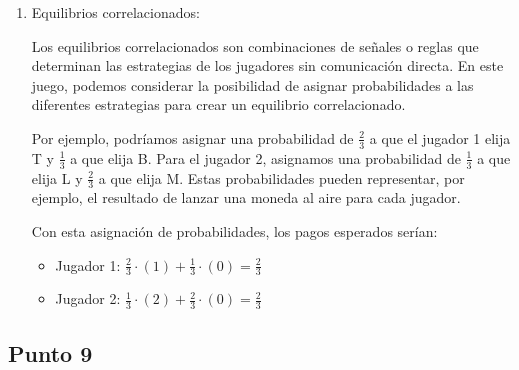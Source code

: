 \documentclass[11pt]{article}
\begin{document}
\begin{enumerate}
    \item Equilibrios correlacionados:
    
    Los equilibrios correlacionados son combinaciones de señales o reglas que determinan las estrategias de los jugadores sin comunicación directa. En este juego, podemos considerar la posibilidad de asignar probabilidades a las diferentes estrategias para crear un equilibrio correlacionado.
    
    Por ejemplo, podríamos asignar una probabilidad de $\frac{2}{3}$ a que el jugador 1 elija T y $\frac{1}{3}$ a que elija B. Para el jugador 2, asignamos una probabilidad de $\frac{1}{3}$ a que elija L y $\frac{2}{3}$ a que elija M. Estas probabilidades pueden representar, por ejemplo, el resultado de lanzar una moneda al aire para cada jugador.
    
    Con esta asignación de probabilidades, los pagos esperados serían:
    \begin{itemize}
    \item Jugador 1: $\frac{2}{3} \cdot (1) + \frac{1}{3} \cdot (0) = \frac{2}{3}$
    \item Jugador 2: $\frac{1}{3} \cdot (2) + \frac{2}{3} \cdot (0) = \frac{2}{3}$
    \end{itemize}
    
\end{enumerate}


\subsection{Punto 9}

\end{document}
